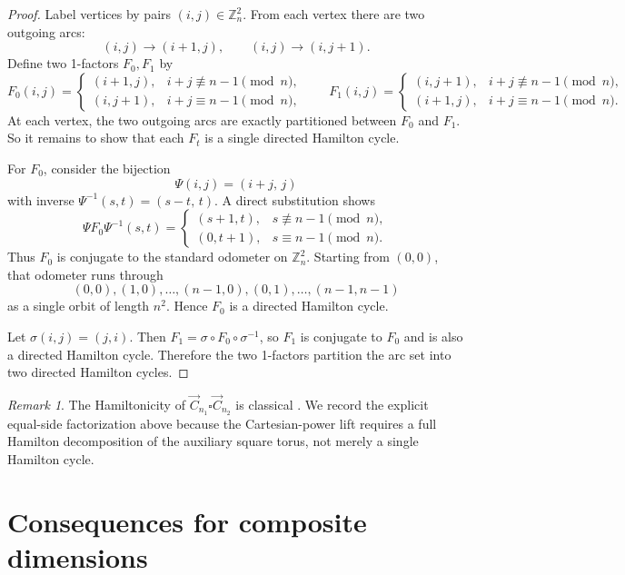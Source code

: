 \documentclass[11pt]{article}
\theoremstyle{remark}
\newtheorem{remark}[theorem]{Remark}
\begin{document}
\begin{proof}
Label vertices by pairs $(i,j)\in \mathbb Z_n^2$.
From each vertex there are two outgoing arcs:
\[(i,j)\to(i+1,j),\qquad (i,j)\to(i,j+1).
\]
Define two 1-factors $F_0,F_1$ by
\[
F_0(i,j)=
\begin{cases}
(i+1,j), & i+j\not\equiv n-1 \pmod n,\\
(i,j+1), & i+j\equiv n-1 \pmod n,
\end{cases}
\qquad
F_1(i,j)=
\begin{cases}
(i,j+1), & i+j\not\equiv n-1 \pmod n,\\
(i+1,j), & i+j\equiv n-1 \pmod n.
\end{cases}
\]
At each vertex, the two outgoing arcs are exactly partitioned between $F_0$ and $F_1$.
So it remains to show that each $F_t$ is a single directed Hamilton cycle.

For $F_0$, consider the bijection
\[
\Psi(i,j)=(i+j,\,j)
\]
with inverse $\Psi^{-1}(s,t)=(s-t,\,t)$.
A direct substitution shows
\[
\Psi F_0 \Psi^{-1}(s,t)=
\begin{cases}
(s+1,t), & s\not\equiv n-1 \pmod n,\\
(0,t+1), & s\equiv n-1 \pmod n.
\end{cases}
\]
Thus $F_0$ is conjugate to the standard odometer on $\mathbb Z_n^2$.
Starting from $(0,0)$, that odometer runs through
\[
(0,0), (1,0), \dots, (n-1,0), (0,1), \dots, (n-1,n-1)
\]
as a single orbit of length $n^2$.
Hence $F_0$ is a directed Hamilton cycle.

Let $\sigma(i,j)=(j,i)$.
Then $F_1=\sigma\circ F_0\circ\sigma^{-1}$, so $F_1$ is conjugate to $F_0$ and is also a directed Hamilton cycle.
Therefore the two 1-factors partition the arc set into two directed Hamilton cycles.
\end{proof}

\begin{remark}
The Hamiltonicity of $\vec C_{n_1}\square\vec C_{n_2}$ is classical \cite{TrotterErdos1978}.
We record the explicit equal-side factorization above because the Cartesian-power lift requires a full Hamilton decomposition of the auxiliary square torus, not merely a single Hamilton cycle.
\end{remark}

\section{Consequences for composite dimensions}
\end{document}
